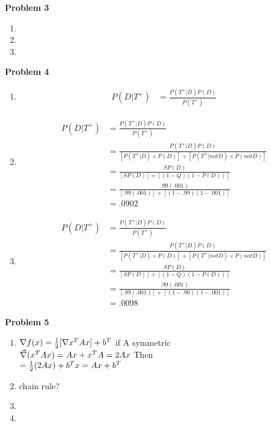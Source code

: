 \documentclass[11pt,letterpaper]{article}
\begin{document}
\textbf{Problem 3}
\begin{enumerate}[labelindent=0pt]
\item 
\item
\item
\end{enumerate}

\textbf{Problem 4}
\begin{enumerate}[labelindent=0pt]
\item 
	\begin{align*}
	P(D|T^+) & =\tfrac{P(T^+|D)P(D)}{P(T^+)}
	\end{align*}
\item 
	\begin{align*}
	P(D|T^+) & =\tfrac{P(T^+|D)P(D)}{P(T^+)} \\
	& =\tfrac{P(T^+|D)P(D)}{[P(T^+|D)\times P(D)]+[P(T^+|not D)\times
P(not D)]} \\
	& = \tfrac{SP(D)}{[SP(D)]+[(1-Q)(1-P(D))]} \\
	& = \tfrac{.99(.001)}{[.99(.001)]+[(1-.99)(1-.001)]} \\
	& = .0902
	\end{align*}
\item 
	\begin{align*}
	P(D|T^+) & =\tfrac{P(T^+|D)P(D)}{P(T^+)} \\
	& =\tfrac{P(T^+|D)P(D)}{[P(T^+|D)\times P(D)]+[P(T^+|not D)\times
P(not D)]} \\
	& = \tfrac{SP(D)}{[SP(D)]+[(1-Q)(1-P(D))]} \\
	& = \tfrac{.99(.001)}{[.99(.001)]+[(1-.90)(1-.001)]} \\
	& = .0098
	\end{align*}
\end{enumerate}

\textbf{Problem 5}
\begin{enumerate}[labelindent=0pt]
\item 
	$\nabla f(x) = \tfrac{1}{2}[\nabla x^TAx]+b^T \\$
if A symmetric \\
	$\vec{\nabla} (x^TAx)=Ax+x^TA=2Ax \\$
Then \\
	$= \tfrac{1}{2}(2Ax)+b^Tx \\
	= Ax+b^T$
\item 
chain rule?
\item
\item
\end{enumerate}
\end{document}

